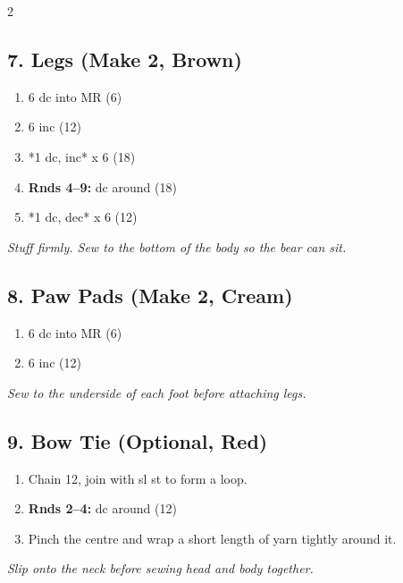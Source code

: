 \begin{multicols}{2}
\subsection*{7. Legs (Make 2, Brown)}
\begin{enumerate}[noitemsep,leftmargin=*]
    \item 6 dc into MR (6)
    \item 6 inc (12)
    \item *1 dc, inc* x 6 (18)
    \item \textbf{Rnds 4--9:} dc around (18)
    \item *1 dc, dec* x 6 (12)
\end{enumerate}
\textit{Stuff firmly. Sew to the bottom of the body so the bear can sit.}

\subsection*{8. Paw Pads (Make 2, Cream)}
\begin{enumerate}[noitemsep,leftmargin=*]
    \item 6 dc into MR (6)
    \item 6 inc (12)
\end{enumerate}
\textit{Sew to the underside of each foot before attaching legs.}

\subsection*{9. Bow Tie (Optional, Red)}
\begin{enumerate}[noitemsep,leftmargin=*]
    \item Chain 12, join with sl st to form a loop.
    \item \textbf{Rnds 2--4:} dc around (12)
    \item Pinch the centre and wrap a short length of yarn tightly around it.
\end{enumerate}
\textit{Slip onto the neck before sewing head and body together.}

\end{multicols}

